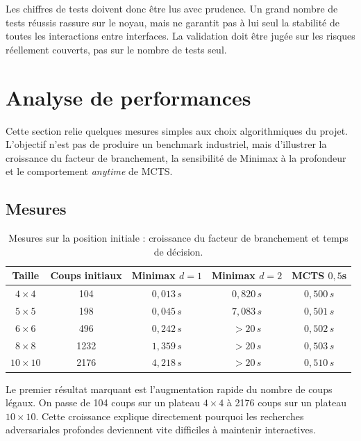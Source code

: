 \documentclass[a4paper]{article}
\providecommand{\toprule}{\hline}
\providecommand{\midrule}{\hline}
\providecommand{\bottomrule}{\hline}
\begin{document}
Les chiffres de tests doivent donc être lus avec prudence. Un grand nombre de tests réussis rassure sur le noyau, mais ne garantit pas à lui seul la stabilité de toutes les interactions entre interfaces. La validation doit être jugée sur les risques réellement couverts, pas sur le nombre de tests seul.


\section{Analyse de performances}

Cette section relie quelques mesures simples aux choix algorithmiques du projet. L'objectif n'est pas de produire un benchmark industriel, mais d'illustrer la croissance du facteur de branchement, la sensibilité de Minimax à la profondeur et le comportement \emph{anytime} de MCTS.

\subsection{Mesures}

\begin{table}[H]
\centering
\small
\begin{tabular}{ccccc}
\toprule
\textbf{Taille} & \textbf{Coups initiaux} & \textbf{Minimax $d=1$} & \textbf{Minimax $d=2$} & \textbf{MCTS $0{,}5$s} \\
\midrule
$4 \times 4$ & 104 & $0{,}013\,s$ & $0{,}820\,s$ & $0{,}500\,s$ \\
$5 \times 5$ & 198 & $0{,}045\,s$ & $7{,}083\,s$ & $0{,}501\,s$ \\
$6 \times 6$ & 496 & $0{,}242\,s$ & $> 20\,s$ & $0{,}502\,s$ \\
$8 \times 8$ & 1232 & $1{,}359\,s$ & $> 20\,s$ & $0{,}503\,s$ \\
$10 \times 10$ & 2176 & $4{,}218\,s$ & $> 20\,s$ & $0{,}510\,s$ \\
\bottomrule
\end{tabular}
\caption{Mesures sur la position initiale : croissance du facteur de branchement et temps de décision.}
\label{tab:benchmarks}
\end{table}

Le premier résultat marquant est l'augmentation rapide du nombre de coups légaux. On passe de 104 coups sur un plateau $4 \times 4$ à 2176 coups sur un plateau $10 \times 10$. Cette croissance explique directement pourquoi les recherches adversariales profondes deviennent vite difficiles à maintenir interactives.
\end{document}
